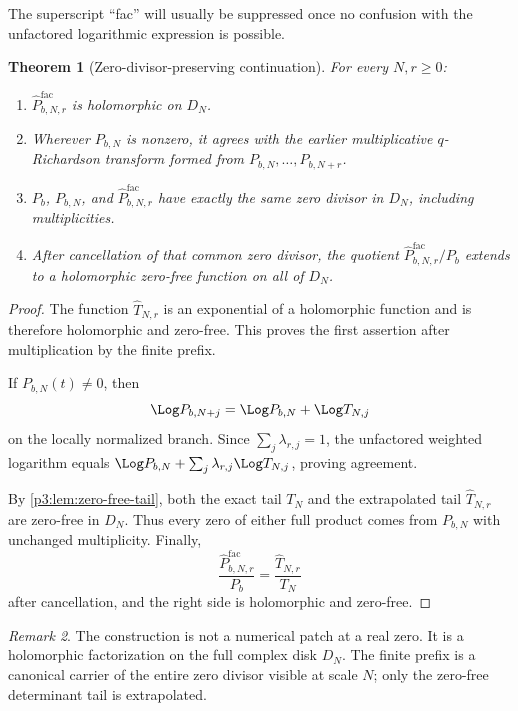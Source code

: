 \documentclass[11pt]{article}
\numberwithin{equation}{section}
\newtheorem{theorem}{Theorem}[section]
\theoremstyle{definition}
\theoremstyle{remark}
\newtheorem{remark}[theorem]{Remark}
\begin{document}
The superscript ``fac'' will usually be suppressed once no confusion with the unfactored
logarithmic expression is possible.

\begin{theorem}[Zero-divisor-preserving continuation]\label{p3:thm:zero-preserving}
For every $N,r\ge0$:
\begin{enumerate}
\item $\widehat P^{\mathrm{fac}}_{b,N,r}$ is holomorphic on $D_N$.
\item Wherever $P_{b,N}$ is nonzero, it agrees with the earlier multiplicative
      $q$-Richardson transform formed from $P_{b,N},\ldots,P_{b,N+r}$.
\item $P_b$, $P_{b,N}$, and $\widehat P^{\mathrm{fac}}_{b,N,r}$ have exactly the same zero
      divisor in $D_N$, including multiplicities.
\item After cancellation of that common zero divisor, the quotient
      $\widehat P^{\mathrm{fac}}_{b,N,r}/P_b$ extends to a holomorphic zero-free function on
      all of $D_N$.
\end{enumerate}
\end{theorem}

\begin{proof}
The function $\widehat T_{N,r}$ is an exponential of a holomorphic function and is therefore
holomorphic and zero-free.  This proves the first assertion after multiplication by the
finite prefix.

If $P_{b,N}(t)\ne0$, then
\[
 \Log P_{b,N+j}=\Log P_{b,N}+\Log T_{N,j}
\]
on the locally normalized branch.  Since $\sum_j\lambda_{r,j}=1$, the unfactored weighted
logarithm equals $\Log P_{b,N}+\sum_j\lambda_{r,j}\Log T_{N,j}$, proving agreement.

By \cref{p3:lem:zero-free-tail}, both the exact tail $T_N$ and the extrapolated tail
$\widehat T_{N,r}$ are zero-free in $D_N$.  Thus every zero of either full product comes
from $P_{b,N}$ with unchanged multiplicity.  Finally,
\[
 \frac{\widehat P^{\mathrm{fac}}_{b,N,r}}{P_b}
 =\frac{\widehat T_{N,r}}{T_N}
\]
after cancellation, and the right side is holomorphic and zero-free.
\end{proof}

\begin{remark}
The construction is not a numerical patch at a real zero.  It is a holomorphic factorization
on the full complex disk $D_N$.  The finite prefix is a canonical carrier of the entire zero
divisor visible at scale $N$; only the zero-free determinant tail is extrapolated.
\end{remark}
\end{document}
